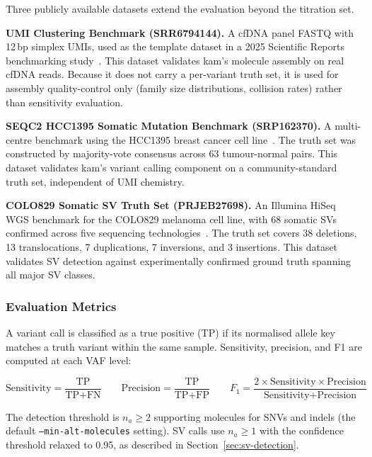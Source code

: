 Three publicly available datasets extend the evaluation beyond the titration set.

\textbf{UMI Clustering Benchmark (SRR6794144).}
A cfDNA panel FASTQ with 12\,bp simplex UMIs, used as the template dataset in a 2025 Scientific Reports benchmarking study~\autocite{Calib25umi}.
This dataset validates kam's molecule assembly on real cfDNA reads.
Because it does not carry a per-variant truth set, it is used for assembly quality-control only (family size distributions, collision rates) rather than sensitivity evaluation.

\textbf{SEQC2 HCC1395 Somatic Mutation Benchmark (SRP162370).}
A multi-centre benchmark using the HCC1395 breast cancer cell line~\autocite{Xiao21seqc2}.
The truth set was constructed by majority-vote consensus across 63 tumour-normal pairs.
This dataset validates kam's variant calling component on a community-standard truth set, independent of UMI chemistry.

\textbf{COLO829 Somatic SV Truth Set (PRJEB27698).}
An Illumina HiSeq WGS benchmark for the COLO829 melanoma cell line, with 68 somatic SVs confirmed across five sequencing technologies~\autocite{vanDijk22colo829}.
The truth set covers 38 deletions, 13 translocations, 7 duplications, 7 inversions, and 3 insertions.
This dataset validates SV detection against experimentally confirmed ground truth spanning all major SV classes.

\subsubsection{Evaluation Metrics}

A variant call is classified as a true positive (TP) if its normalised allele key matches a truth variant within the same sample.
Sensitivity, precision, and F1 are computed at each VAF level:

\begin{equation}
  \label{eq:sensitivity}
  \text{Sensitivity} = \frac{\text{TP}}{\text{TP} + \text{FN}}
  \qquad
  \text{Precision} = \frac{\text{TP}}{\text{TP} + \text{FP}}
  \qquad
  F_1 = \frac{2 \times \text{Sensitivity} \times \text{Precision}}{\text{Sensitivity} + \text{Precision}}
\end{equation}

The detection threshold is $n_a \ge 2$ supporting molecules for SNVs and indels (the default \texttt{--min-alt-molecules} setting).
SV calls use $n_a \ge 1$ with the confidence threshold relaxed to 0.95, as described in Section~\ref{sec:sv-detection}.

